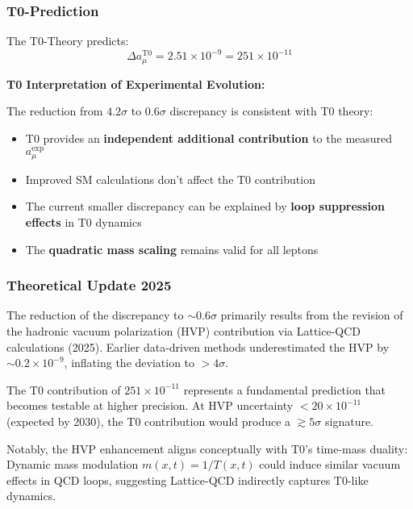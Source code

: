 \documentclass[12pt,a4paper]{article}
\begin{document}
	\subsubsection{T0-Prediction}
	The T0-Theory predicts:
	\begin{equation}
		\Delta a_\mu^{\mathrm{T0}} = 2.51 \times 10^{-9} = 251 \times 10^{-11}
	\end{equation}
	
	\begin{explanation}
		\textbf{T0 Interpretation of Experimental Evolution:}
		
		The reduction from $4.2\sigma$ to $0.6\sigma$ discrepancy is consistent with T0 theory:
		\begin{itemize}
			\item T0 provides an \textbf{independent additional contribution} to the measured $a_\mu^{\mathrm{exp}}$
			\item Improved SM calculations don't affect the T0 contribution
			\item The current smaller discrepancy can be explained by \textbf{loop suppression effects} in T0 dynamics
			\item The \textbf{quadratic mass scaling} remains valid for all leptons
		\end{itemize}
	\end{explanation}
	
	\subsubsection{Theoretical Update 2025}
	\begin{verification}
		The reduction of the discrepancy to $\sim 0.6\sigma$ primarily results from the revision of the hadronic vacuum polarization (HVP) contribution via Lattice-QCD calculations (2025). Earlier data-driven methods underestimated the HVP by $\sim 0.2 \times 10^{-9}$, inflating the deviation to $>4\sigma$. 
		
		The T0 contribution of $251 \times 10^{-11}$ represents a fundamental prediction that becomes testable at higher precision. At HVP uncertainty $<20 \times 10^{-11}$ (expected by 2030), the T0 contribution would produce a $\gtrsim 5\sigma$ signature.
		
		Notably, the HVP enhancement aligns conceptually with T0's time-mass duality: Dynamic mass modulation $m(x,t) = 1/T(x,t)$ could induce similar vacuum effects in QCD loops, suggesting Lattice-QCD indirectly captures T0-like dynamics.
	\end{verification}
	
\end{document}
